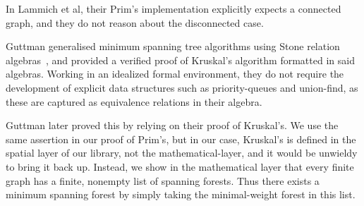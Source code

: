 In Lammich et al, their Prim's implementation explicitly expects a connected graph, and they do not reason about the disconnected case.

Guttman generalised minimum spanning tree algorithms using Stone relation algebras~\cite{DBLP:journals/jlp/Guttmann18}, and provided a verified proof of Kruskal's algorithm formatted in said algebras.  Working in an idealized formal environment, they do not require the development of explicit data structures such as priority-queues and union-find, as these are captured as equivalence relations in their algebra.

Guttman later proved this by relying on their proof of Kruskal's. We use the same assertion in our proof of Prim's, but in our case, Kruskal's is defined in the spatial layer of our library, not the mathematical-layer, and it would be unwieldy to bring it back up. Instead, we show in the mathematical layer that every finite graph has a finite, nonempty list of spanning forests. Thus there exists a minimum spanning forest by simply taking the minimal-weight forest in this list. 